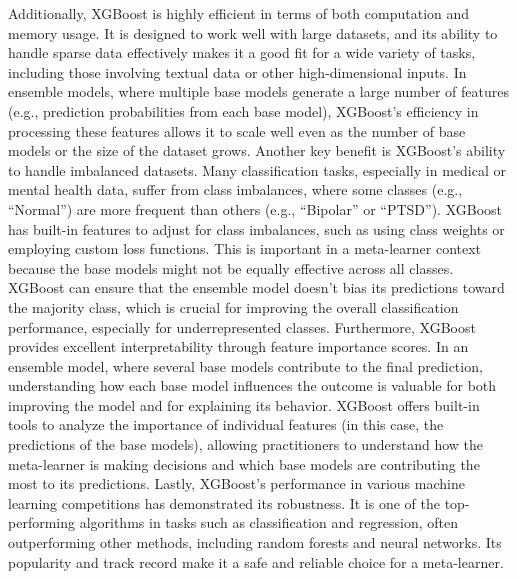 \vspace{1em}
\noindent
Additionally, XGBoost is highly efficient in terms of both computation and memory usage. It is designed to work well with large datasets, and its ability to handle sparse data effectively makes it a good fit for a wide variety of tasks, including those involving textual data or other high-dimensional inputs. In ensemble models, where multiple base models generate a large number of features (e.g., prediction probabilities from each base model), XGBoost’s efficiency in processing these features allows it to scale well even as the number of base models or the size of the dataset grows. Another key benefit is XGBoost’s ability to handle imbalanced datasets. Many classification tasks, especially in medical or mental health data, suffer from class imbalances, where some classes (e.g., “Normal”) are more frequent than others (e.g., “Bipolar” or “PTSD”). XGBoost has built-in features to adjust for class imbalances, such as using class weights or employing custom loss functions. This is important in a meta-learner context because the base models might not be equally effective across all classes. XGBoost can ensure that the ensemble model doesn't bias its predictions toward the majority class, which is crucial for improving the overall classification performance, especially for underrepresented classes.  Furthermore, XGBoost provides excellent interpretability through feature importance scores. In an ensemble model, where several base models contribute to the final prediction, understanding how each base model influences the outcome is valuable for both improving the model and for explaining its behavior. XGBoost offers built-in tools to analyze the importance of individual features (in this case, the predictions of the base models), allowing practitioners to understand how the meta-learner is making decisions and which base models are contributing the most to its predictions. Lastly, XGBoost’s performance in various machine learning competitions has demonstrated its robustness. It is one of the top-performing algorithms in tasks such as classification and regression, often outperforming other methods, including random forests and neural networks. Its popularity and track record make it a safe and reliable choice for a meta-learner.


\vspace{1em}

